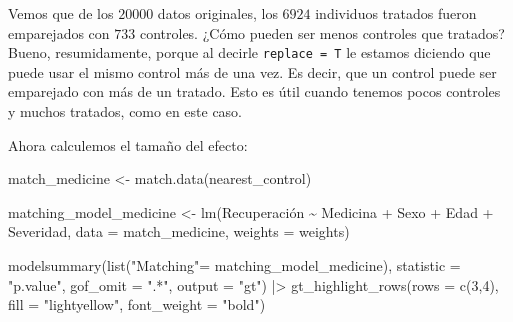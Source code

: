 \documentclass[
  letterpaper,
  DIV=11,
  numbers=noendperiod,
  oneside]{scrreprt}
\newenvironment{Shaded}{\begin{snugshade}}{\end{snugshade}}
\newcommand{\AttributeTok}[1]{\textcolor[rgb]{0.40,0.45,0.13}{#1}}
\newcommand{\DecValTok}[1]{\textcolor[rgb]{0.68,0.00,0.00}{#1}}
\newcommand{\FunctionTok}[1]{\textcolor[rgb]{0.28,0.35,0.67}{#1}}
\newcommand{\NormalTok}[1]{\textcolor[rgb]{0.00,0.23,0.31}{#1}}
\newcommand{\OtherTok}[1]{\textcolor[rgb]{0.00,0.23,0.31}{#1}}
\newcommand{\SpecialCharTok}[1]{\textcolor[rgb]{0.37,0.37,0.37}{#1}}
\newcommand{\StringTok}[1]{\textcolor[rgb]{0.13,0.47,0.30}{#1}}
\begin{document}
Vemos que de los \(20000\) datos originales, los \(6924\) individuos
tratados fueron emparejados con \(733\) controles. ¿Cómo pueden ser
menos controles que tratados? Bueno, resumidamente, porque al decirle
\texttt{replace\ =\ T} le estamos diciendo que puede usar el mismo
control más de una vez. Es decir, que un control puede ser emparejado
con más de un tratado. Esto es útil cuando tenemos pocos controles y
muchos tratados, como en este caso.

Ahora calculemos el tamaño del efecto:

\begin{Shaded}
\begin{Highlighting}[]
\NormalTok{match\_medicine }\OtherTok{\textless{}{-}} \FunctionTok{match.data}\NormalTok{(nearest\_control)}

\NormalTok{matching\_model\_medicine }\OtherTok{\textless{}{-}} \FunctionTok{lm}\NormalTok{(Recuperación }\SpecialCharTok{\textasciitilde{}}\NormalTok{ Medicina }\SpecialCharTok{+}\NormalTok{ Sexo }\SpecialCharTok{+}\NormalTok{ Edad }\SpecialCharTok{+}\NormalTok{ Severidad, }
                              \AttributeTok{data =}\NormalTok{ match\_medicine, }
                              \AttributeTok{weights =}\NormalTok{ weights)}

\FunctionTok{modelsummary}\NormalTok{(}\FunctionTok{list}\NormalTok{(}\StringTok{"Matching"}\OtherTok{=}\NormalTok{ matching\_model\_medicine),}
             \AttributeTok{statistic =} \StringTok{"p.value"}\NormalTok{, }
             \AttributeTok{gof\_omit =} \StringTok{".*"}\NormalTok{,}
             \AttributeTok{output =} \StringTok{"gt"}\NormalTok{) }\SpecialCharTok{|\textgreater{}}
  \FunctionTok{gt\_highlight\_rows}\NormalTok{(}\AttributeTok{rows =} \FunctionTok{c}\NormalTok{(}\DecValTok{3}\NormalTok{,}\DecValTok{4}\NormalTok{), }
                    \AttributeTok{fill =} \StringTok{"lightyellow"}\NormalTok{,}
                    \AttributeTok{font\_weight =} \StringTok{"bold"}\NormalTok{)}
\end{Highlighting}
\end{Shaded}
\end{document}
